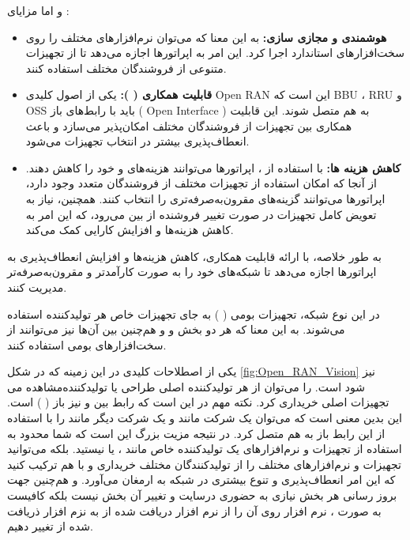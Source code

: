 \documentclass[landscape, 12pt]{report}
\begin{document}
	و اما مزایای 
	:
\begin{itemize}
\item \textbf{هوشمندی و مجازی سازی:}
به این معنا که می‌توان نرم‌افزارهای مختلف را روی سخت‌افزارهای استاندارد اجرا کرد. این امر به اپراتورها اجازه می‌دهد تا از تجهیزات متنوعی از فروشندگان مختلف استفاده کنند.
\item 
\textbf{قابلیت همکاری (
): }
یکی از اصول کلیدی 
Open RAN
 این است که
  BBU
  ،
   RRU
    و
     OSS
      باید با رابط‌های باز
       (
       Open Interface
       ) به هم متصل شوند. این قابلیت همکاری بین تجهیزات از فروشندگان مختلف امکان‌پذیر می‌سازد و باعث انعطاف‌پذیری بیشتر در انتخاب تجهیزات می‌شود.


\item \textbf{کاهش هزینه ها:} 
با استفاده از 
، اپراتورها می‌توانند هزینه‌های
  و
    خود را کاهش دهند. از آنجا که امکان استفاده از تجهیزات مختلف از فروشندگان متعدد وجود دارد، اپراتورها می‌توانند گزینه‌های مقرون‌به‌صرفه‌تری را انتخاب کنند. همچنین، نیاز به تعویض کامل تجهیزات در صورت تغییر فروشنده از بین می‌رود، که این امر به کاهش هزینه‌ها و افزایش کارایی کمک می‌کند.

\end{itemize}
	به طور خلاصه،
	 با ارائه قابلیت همکاری، کاهش هزینه‌ها و افزایش انعطاف‌پذیری به اپراتورها اجازه می‌دهد تا شبکه‌های خود را به صورت کارآمدتر و مقرون‌به‌صرفه‌تر مدیریت کنند.
	
	در این نوع شبکه، تجهیزات بومی (
	) به جای تجهیزات خاص هر تولیدکننده استفاده می‌شوند. به این معنا که هر دو بخش
 و
    و هم‌چنین
     بین آن‌ها نیز می‌توانند از سخت‌افزارهای بومی استفاده کنند.
	
	یکی از اصطلاحات کلیدی در این زمینه که در شکل \ref{fig:Open_RAN_Vision} نیز مشاهده می‎‌شود
	   است.
	     را می‌توان از هر تولیدکننده اصلی طراحی
	       یا تولیدکننده تجهیزات اصلی 
	 خریداری کرد. نکته مهم در 
	 این است که رابط بین
	   و
	     نیز باز (
	      ) است. این 
	بدین معنی است که می‌توان
	 یک شرکت مانند
	   و
	     یک شرکت دیگر مانند
	        را با استفاده از این رابط باز به هم متصل کرد. در نتیجه مزیت بزرگ 
	         این است که شما محدود به استفاده از تجهیزات و نرم‌افزارهای یک تولیدکننده خاص مانند
	          ، 
	          یا
	          نیستید. بلکه می‌توانید تجهیزات و نرم‌افزارهای مختلف را از تولیدکنندگان مختلف خریداری و با هم ترکیب کنید که این امر انعطاف‌پذیری و تنوع بیشتری در شبکه به ارمغان می‌آورد. و هم‌چنین جهت بروز رسانی هر بخش نیازی به حضوری درسایت و تغییر
	            آن بخش نیست بلکه کافیست به صورت
	              ، نرم افزار روی آن را از نرم افزار دریافت شده از
	                 به نزم افزار ذریافت شده از
	                    تغییر دهیم.
	
\end{document}
